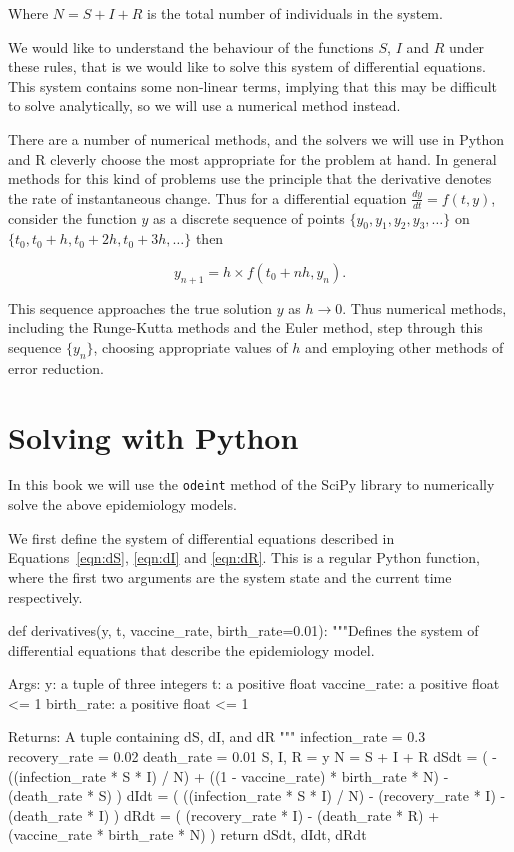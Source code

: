 Where $N = S + I + R$ is the total number of individuals in the system.

We would like to understand the behaviour of the functions $S$, $I$ and $R$
under these rules, that is we would like to solve this system of differential
equations. This system contains some non-linear terms, implying that this may be
difficult to solve analytically, so we will use a numerical method instead.

There are a number of numerical methods, and the solvers we will use in Python
and R cleverly choose the most appropriate for the problem at hand. In general
methods for this kind of problems use the principle that the derivative denotes
the rate of instantaneous change. Thus for a differential equation
$\frac{dy}{dt} = f(t,y)$, consider the function $y$ as a discrete sequence of
points $\{y_0, y_1, y_2, y_3, \dots\}$ on
$\{t_0, t_0 + h, t_0 + 2h, t_0 + 3h, \dots\}$ then

\begin{equation}
y_{n+1} = h \times f(t_0 + nh, y_n).
\end{equation}

This sequence approaches the true solution $y$ as $h \rightarrow 0$.
Thus numerical methods, including the Runge-Kutta methods and the Euler method,
step through this sequence $\{y_n\}$, choosing appropriate values of $h$ and
employing other methods of error reduction.


\section{Solving with Python}\label{sec:solving-with-python}
In this book we will use the \texttt{odeint} method of the SciPy
library to numerically solve the above epidemiology models.

We first define the system of differential equations described in
Equations~\ref{eqn:dS}, \ref{eqn:dI} and \ref{eqn:dR}.
This is a regular Python function, where the first two arguments are the system
state and the current time respectively.

\begin{pyin}
def derivatives(y, t, vaccine_rate, birth_rate=0.01):
    """Defines the system of differential equations that
    describe the epidemiology model.

    Args:
        y: a tuple of three integers
        t: a positive float
        vaccine_rate: a positive float <= 1
        birth_rate: a positive float <= 1

    Returns:
        A tuple containing dS, dI, and dR
    """
    infection_rate = 0.3
    recovery_rate = 0.02
    death_rate = 0.01
    S, I, R = y
    N = S + I + R
    dSdt = (
        -((infection_rate * S * I) / N)
        + ((1 - vaccine_rate) * birth_rate * N)
        - (death_rate * S)
    )
    dIdt = (
        ((infection_rate * S * I) / N)
        - (recovery_rate * I)
        - (death_rate * I)
    )
    dRdt = (
        (recovery_rate * I)
        - (death_rate * R)
        + (vaccine_rate * birth_rate * N)
    )
    return dSdt, dIdt, dRdt
\end{pyin}

